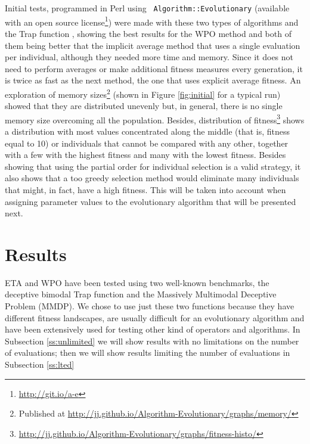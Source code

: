 \documentclass{svmult}
\begin{document}
\sloppypar Initial tests, programmed in Perl using {\tt
  Algorithm::Evolutionary} \cite{ae09} (available with an open %
source license\footnote{\url{http://git.io/a-e}}) were made with these two types of algorithms and the
Trap function \cite{wilcoxon:ga}, showing the best results for the WPO
method and both of them being better that
the implicit average method that uses a single evaluation per
individual, although they needed more time and memory. Since it does not need to perform averages or make
additional fitness measures every generation, it is twice as fast as
the next method, the one that uses explicit average fitness. An
exploration of memory sizes\footnote{Published at \url{http://jj.github.io/Algorithm-Evolutionary/graphs/memory/} } %
(shown in Figure \ref{fig:initial} for a
typical run) showed that they are distributed unevenly but, in general, there is no single memory size
overcoming all the population. Besides, distribution of fitness\footnote{\url{http://jj.github.io/Algorithm-Evolutionary/graphs/fitness-histo/}} shows a
distribution with most values concentrated along the middle (that is,
fitness equal to 10) or individuals that cannot be compared with any
other,
 together with a few with the highest fitness and many with the
lowest fitness. Besides showing that using the partial order for individual selection 
is a valid strategy, it also shows that a too greedy selection method would
eliminate many individuals that might, in fact, have a high fitness. This
will be taken into account when assigning parameter values to the
evolutionary algorithm that will be presented next.



\section{Results}
\label{sec:res}

ETA and WPO have been tested using two well-known benchmarks, the deceptive bimodal Trap \cite{deb1992analyzing}
function and the Massively Multimodal Deceptive Problem \cite{goldberg92massive} (MMDP). 
We chose to use just these two functions 
because they have different fitness landscapes, are usually difficult
for an evolutionary algorithm and have been extensively used for
testing other kind of operators and algorithms. In Subsection
\ref{ss:unlimited} we will show results with no limitations on the
number of evaluations; then we will show results limiting the number
of evaluations in Subsection \ref{ss:lted}
\end{document}
